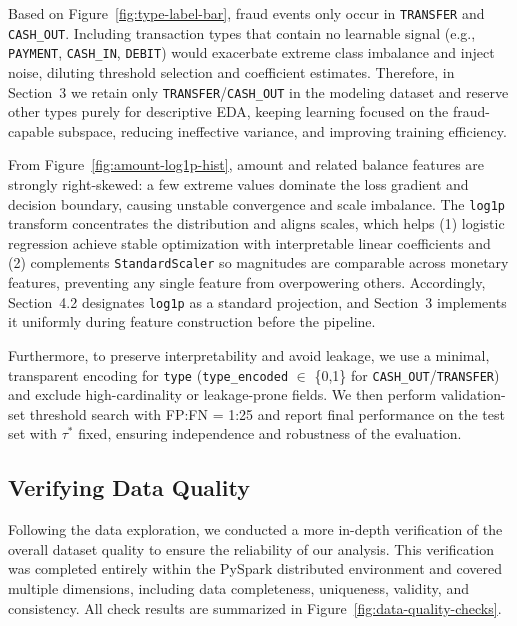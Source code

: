 \documentclass[sigplan,screen]{acmart}
\begin{document}
Based on Figure~\ref{fig:type-label-bar}, fraud events only occur in \texttt{TRANSFER} and \texttt{CASH\_OUT}. Including transaction types that contain no learnable signal (e.g., \texttt{PAYMENT}, \texttt{CASH\_IN}, \texttt{DEBIT}) would exacerbate extreme class imbalance and inject noise, diluting threshold selection and coefficient estimates. Therefore, in Section~3 we retain only \texttt{TRANSFER}/\texttt{CASH\_OUT} in the modeling dataset and reserve other types purely for descriptive EDA, keeping learning focused on the fraud-capable subspace, reducing ineffective variance, and improving training efficiency.

From Figure~\ref{fig:amount-log1p-hist}, amount and related balance features are strongly right-skewed: a few extreme values dominate the loss gradient and decision boundary, causing unstable convergence and scale imbalance. The \texttt{log1p} transform concentrates the distribution and aligns scales, which helps (1) logistic regression achieve stable optimization with interpretable linear coefficients and (2) complements \texttt{StandardScaler} so magnitudes are comparable across monetary features, preventing any single feature from overpowering others. Accordingly, Section~4.2 designates \texttt{log1p} as a standard projection, and Section~3 implements it uniformly during feature construction before the pipeline.

Furthermore, to preserve interpretability and avoid leakage, we use a minimal, transparent encoding for \texttt{type} (\texttt{type\_\allowbreak encoded} \texorpdfstring{$\in$}{∈} \{0,1\} for \texttt{CASH\_OUT}/\texttt{TRANSFER}) and exclude high-cardinality or leakage-prone fields. We then perform validation-set threshold search with FP:FN = 1:25 and report final performance on the test set with $\tau^*$ fixed, ensuring independence and robustness of the evaluation.

\subsection{Verifying Data Quality}

Following the data exploration, we conducted a more in-depth verification of the overall dataset quality to ensure the reliability of our analysis. This verification was completed entirely within the PySpark distributed environment and covered multiple dimensions, including data completeness, uniqueness, validity, and consistency. All check results are summarized in Figure~\ref{fig:data-quality-checks}.
\end{document}
